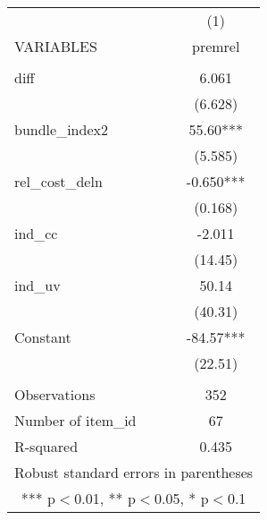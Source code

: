 \documentclass[]{article}
\begin{document}
\begin{tabular}{lc} \hline
 & (1) \\
VARIABLES & premrel \\ \hline
 &  \\
diff & 6.061 \\
 & (6.628) \\
bundle\_index2 & 55.60*** \\
 & (5.585) \\
rel\_cost\_deln & -0.650*** \\
 & (0.168) \\
ind\_cc & -2.011 \\
 & (14.45) \\
ind\_uv & 50.14 \\
 & (40.31) \\
Constant & -84.57*** \\
 & (22.51) \\
 &  \\
Observations & 352 \\
Number of item\_id & 67 \\
 R-squared & 0.435 \\ \hline
\multicolumn{2}{c}{ Robust standard errors in parentheses} \\
\multicolumn{2}{c}{ *** p$<$0.01, ** p$<$0.05, * p$<$0.1} \\
\end{tabular}
\end{document}
